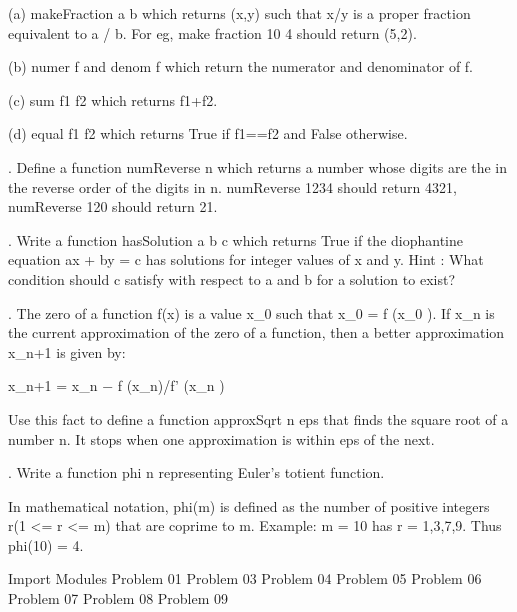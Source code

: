 \documentclass{report}%
\begin{document}
 (a) makeFraction a b which returns (x,y) such that x/y  is  a  proper
fraction equivalent to a / b. For eg, make fraction 10 4 should return
(5,2).

 (b) numer f and denom f which return the numerator and denominator of
f.

 (c) sum f1 f2 which returns f1+f2.

 (d) equal f1 f2 which returns True if  f1==f2  and  False  otherwise.


\nwenddocs{}\endmoddef\nwstartdeflinemarkup\nwenddeflinemarkup

\nwendcode{}. Define a function numReverse  n which returns a number whose digits
are the in the reverse order of the  digits  in  n.   numReverse  1234
should   return   4321,   numReverse    120    should    return    21.


\nwenddocs{}\endmoddef\nwstartdeflinemarkup\nwenddeflinemarkup

\nwendcode{}.  Write a function hasSolution a b  c  which  returns  True  if  the
diophantine equation ax + by = c has solutions for integer values of x
and y. Hint : What condition should  c satisfy with respect to a and b
for a solution to exist?

\nwenddocs{}\endmoddef\nwstartdeflinemarkup\nwenddeflinemarkup

\nwendcode{}.  The zero of a function f(x) is a value x_0 such that x_0 = f  (x_0
). If x_n is the current approximation of the zero of a function, then
a better  approximation x_{n+1} is  given by:

               x_{n+1}  = x_n −  f (x_n)/f' (x_n )

Use this fact to define a function approxSqrt n  eps  that  finds  the
square root of a number n.  It stops when one approximation is  within
eps of the next.

\nwenddocs{}\endmoddef\nwstartdeflinemarkup\nwenddeflinemarkup

\nwendcode{}.  Write a function phi  n  representing  Euler’s  totient  function.

In mathematical notation, phi(m) is defined as the number of  positive
integers r(1 <= r <= m) that are coprime to m.  Example: m = 10 has  r
= 1,3,7,9.  Thus phi(10) = 4.
\nwenddocs{}\endmoddef\nwstartdeflinemarkup\nwenddeflinemarkup

\nwendcode{}\nwdocspar

\nwenddocs{}\moddef{*}\endmoddef\nwstartdeflinemarkup\nwenddeflinemarkup
\LA{}Import Modules\RA{} 
\LA{}Problem 01\RA{} 
\LA{}Problem 03\RA{}
\LA{}Problem 04\RA{} 
\LA{}Problem 05\RA{} 
\LA{}Problem 06\RA{} 
\LA{}Problem 07\RA{} 
\LA{}Problem 08\RA{}
\LA{}Problem 09\RA{}

\nwendcode{}\nwdocspar
\end{document}
